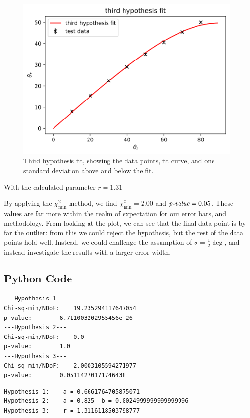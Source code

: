 \documentclass[a4paper]{article}
\begin{document}
\begin{figure}[hb!]
\centerline{\includegraphics[scale=0.5]{fit3.png}}
\caption{Third hypothesis fit, showing the data points, fit curve, and one standard deviation above and below the fit.}
\label{fig:fit3}
\end{figure}

With the calculated parameter $r=1.31$  

By applying the $\chi^2_\text{min}$ method, we find $\chi^2_\text{min}=2.00$ and $\text{\it{p-value}}=0.05$. These values are far more within the realm of expectation for our error bars, and methodology. From looking at the plot, we can see that the final data point is by far the outlier: from this we could reject the hypothesis, but the rest of the data points hold well. Instead, we could challenge the assumption of $\sigma=\frac12\deg$, and instead investigate the results with a larger error width.

\begin{appendix}
\section{Python Code}\label{sec:python}


\begin{verbatim}
---Hypothesis 1---
Chi-sq-min/NDoF:	19.235294117647054
p-value:		6.711003202955456e-26
---Hypothesis 2---
Chi-sq-min/NDoF:	0.0
p-value:		1.0
---Hypothesis 3---
Chi-sq-min/NDoF:	2.0003105594271977
p-value:		0.05114270171746438
\end{verbatim}

\begin{verbatim}
Hypothesis 1:	 a = 0.6661764705875071
Hypothesis 2:	 a = 0.825	b = 0.0024999999999999996
Hypothesis 3:	 r = 1.3116118503798777
\end{verbatim}

\end{appendix}
\end{document}
